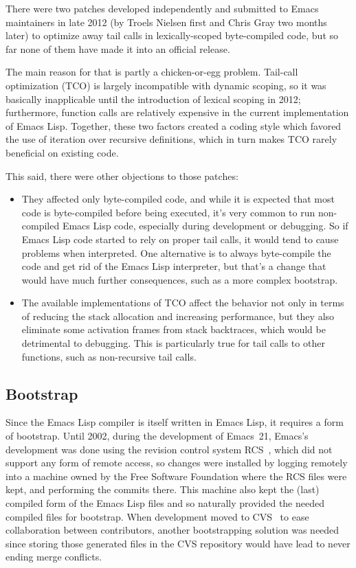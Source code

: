 \documentclass[format=acmsmall,screen]{acmart}
\newcommand \Elisp {Emacs Lisp}
\begin{document}
There were two patches developed independently and submitted to Emacs
maintainers in late 2012 (by Troels Nielsen first and Chris Gray two months
later) to optimize away tail calls in lexically-scoped byte-compiled code,
but so far none of them have made it into an official release.

The main reason for that is partly a chicken-or-egg problem.  Tail-call
optimization (TCO) is largely incompatible with dynamic scoping, so it was
basically inapplicable until the introduction of lexical scoping in 2012;
furthermore, function calls are relatively expensive in the current
implementation of \Elisp{}.  Together, these two factors created a coding
style which favored the use of iteration over recursive definitions, which
in turn makes TCO rarely beneficial on existing code.

This said, there were other objections to those patches:
\begin{itemize}
\item They affected only byte-compiled code, and while it is expected that
  most code is byte-compiled before being executed, it's very common to run
  non-compiled \Elisp{} code, especially during development or debugging.
  So if \Elisp{} code started to rely on proper tail calls, it would tend to cause problems
  when interpreted.  One alternative is to always byte-compile the code and
  get rid of the \Elisp{} interpreter, but that's a change that would have
  much further consequences, such as a more complex bootstrap.
\item The available implementations of TCO affect the behavior not only in
  terms of reducing the stack
  allocation and increasing performance, but they also eliminate some
  activation frames from stack backtraces, which would be detrimental to
  debugging.  This is particularly true for tail calls to
  other functions, such as non-recursive tail calls.
\end{itemize}

\subsection{Bootstrap}
\label{sec:bootstrap}

Since the \Elisp{} compiler is itself written in \Elisp{}, it requires
a form of bootstrap.  Until 2002, during the development of Emacs~21, Emacs's
development was done using the revision control system RCS~\cite{Tichy85},
which did not support any form of remote access, so
changes were installed by logging remotely into a machine owned by the
Free Software Foundation where the RCS files were kept, and
performing the commits there.  This machine also kept the (last) compiled
form of the \Elisp{} files and so naturally provided the needed compiled
files for bootstrap.  When development moved to CVS~\cite{Berliner90} to ease
collaboration between contributors, another bootstrapping solution was needed since
storing those generated files in the CVS repository
would have lead to never ending merge conflicts.
\end{document}
